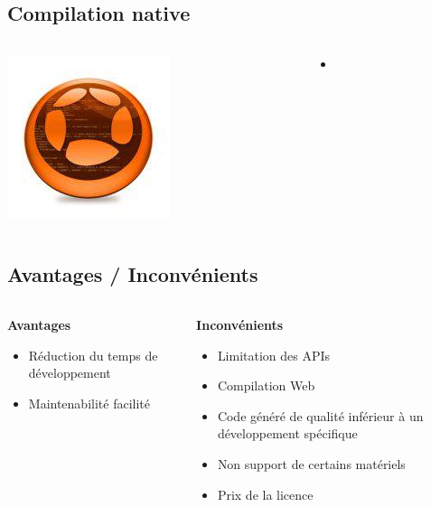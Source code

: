\documentclass{beamer}
\begin{document}
\subsection{Compilation native}
\begin{frame}
\begin{columns}[c]
  \begin{column}{0.5\textwidth}
    \includegraphics[scale=0.7]{corona}
  \end{column}
  \begin{column}{0.5\textwidth}
    \begin{itemize}
      \item
    \end{itemize}
  \end{column}
\end{columns}
\end{frame}

\subsection{Avantages / Inconvénients}
\begin{frame}
\begin{columns}[c]
  \begin{column}{0.5\textwidth}
    \textbf{Avantages}
    \begin{itemize}
      \item Réduction du temps de développement
      \item Maintenabilité facilité
    \end{itemize}
  \end{column}
  \begin{column}{0.5\textwidth}
    \textbf{Inconvénients}
    \begin{itemize}
      \item Limitation des APIs
      \item Compilation Web
      \item Code généré de qualité inférieur à un développement spécifique
      \item Non support de certains matériels
      \item Prix de la licence
    \end{itemize}
  \end{column}
\end{columns}
\end{frame}
\end{document}
